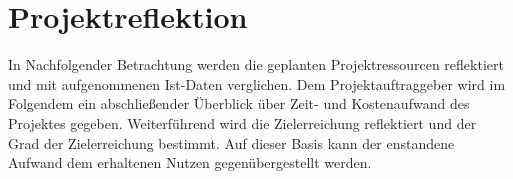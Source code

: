 \section{Projektreflektion}
\label{sec:Projektreflektion}

In Nachfolgender Betrachtung werden die geplanten Projektressourcen reflektiert
und mit aufgenommenen Ist-Daten verglichen. Dem Projektauftraggeber wird im
Folgendem ein abschließender Überblick über Zeit- und Kostenaufwand des
Projektes gegeben. Weiterführend wird die Zielerreichung reflektiert und der
Grad der Zielerreichung bestimmt. Auf dieser Basis kann der enstandene Aufwand
dem erhaltenen Nutzen gegenübergestellt werden.




